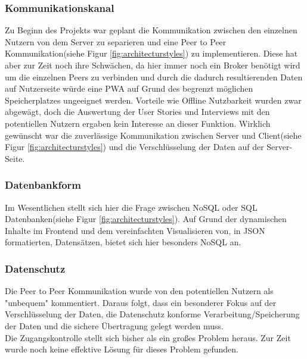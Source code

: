 \documentclass[10pt]{article}
\begin{document}
            \subsubsection{Kommunikationskanal}\label{sec:communicationchannel}
            Zu Beginn des Projekts war geplant die Kommunikation zwischen den einzelnen Nutzern von dem Server zu separieren und eine Peer to Peer Kommunikation(siehe Figur \ref{fig:architecturstyles}) zu implementieren. Diese hat aber zur Zeit noch ihre Schwächen, da hier immer noch ein Broker\cite{solance2012} benötigt wird um die einzelnen Peers zu verbinden und durch die dadurch resultierenden Daten auf Nutzerseite würde eine PWA auf Grund des begrenzt möglichen Speicherplatzes\cite{webdev2021} ungeeignet werden. Vorteile wie Offline Nutzbarkeit wurden zwar abgewägt, doch die Auswertung der User Stories und Interviews mit den potentiellen Nutzern ergaben kein Interesse an dieser Funktion. Wirklich gewünscht war die zuverlässige Kommunikation zwischen Server und Client(siehe Figur \ref{fig:architecturstyles}) und die Verschlüsselung der Daten auf der Server-Seite.

            \subsubsection{Datenbankform}\label{sec:databasetype}
            Im Wesentlichen stellt sich hier die Frage zwischen NoSQL oder SQL Datenbanken(siehe Figur \ref{fig:architecturstyles}). Auf Grund der dynamischen Inhalte im Frontend und dem vereinfachten Visualisieren von, in JSON formatierten, Datensätzen, bietet sich hier besonders NoSQL an. 

            \subsubsection{Datenschutz}\label{sec:privacy}
            Die Peer to Peer Kommunikation wurde von den potentiellen Nutzern als "unbequem" kommentiert. Daraus folgt, dass ein besonderer Fokus auf der Verschlüsselung der Daten, die Datenschutz konforme Verarbeitung/Speicherung der Daten und die sichere Übertragung gelegt werden muss. \\
            Die Zugangskontrolle stellt sich bisher als ein großes Problem heraus. Zur Zeit wurde noch keine effektive Lösung für dieses Problem gefunden. 
            
\end{document}
